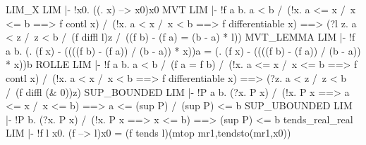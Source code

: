 \ENDTHEOREM
\THEOREM LIM\_X LIM
|- !x0. ((\x. x) --> x0)x0
\ENDTHEOREM
\THEOREM MVT LIM
|- !f a b.
    a < b /\
    (!x. a <= x /\ x <= b ==> f contl x) /\
    (!x. a < x /\ x < b ==> f differentiable x) ==>
    (?l z.
      a < z /\ z < b /\ (f diffl l)z /\ ((f b) - (f a) = (b - a) * l))
\ENDTHEOREM
\THEOREM MVT\_LEMMA LIM
|- !f a b.
    (\x. (f x) - ((((f b) - (f a)) / (b - a)) * x))a =
    (\x. (f x) - ((((f b) - (f a)) / (b - a)) * x))b
\ENDTHEOREM
\THEOREM ROLLE LIM
|- !f a b.
    a < b /\
    (f a = f b) /\
    (!x. a <= x /\ x <= b ==> f contl x) /\
    (!x. a < x /\ x < b ==> f differentiable x) ==>
    (?z. a < z /\ z < b /\ (f diffl (& 0))z)
\ENDTHEOREM
\THEOREM SUP\_BOUNDED LIM
|- !P a b.
    (?x. P x) /\ (!x. P x ==> a <= x /\ x <= b) ==>
    a <= (sup P) /\ (sup P) <= b
\ENDTHEOREM
\THEOREM SUP\_UBOUNDED LIM
|- !P b. (?x. P x) /\ (!x. P x ==> x <= b) ==> (sup P) <= b
\ENDTHEOREM
\THEOREM tends\_real\_real LIM
|- !f l x0. (f --> l)x0 = (f tends l)(mtop mr1,tendsto(mr1,x0))
\ENDTHEOREM
